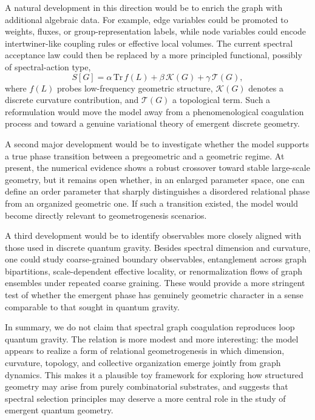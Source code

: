 \documentclass[11pt]{article}
\begin{document}
A natural development in this direction would be to enrich the graph with additional algebraic data.
For example, edge variables could be promoted to weights, fluxes, or group-representation labels, while node variables could encode intertwiner-like coupling rules or effective local volumes.
The current spectral acceptance law could then be replaced by a more principled functional, possibly of spectral-action type,
\[
S[G] = \alpha\,\mathrm{Tr}\,f(L) + \beta\,\mathcal{K}(G) + \gamma\,\mathcal{T}(G),
\]
where $f(L)$ probes low-frequency geometric structure, $\mathcal{K}(G)$ denotes a discrete curvature contribution, and $\mathcal{T}(G)$ a topological term.
Such a reformulation would move the model away from a phenomenological coagulation process and toward a genuine variational theory of emergent discrete geometry.

A second major development would be to investigate whether the model supports a true phase transition between a pregeometric and a geometric regime.
At present, the numerical evidence shows a robust crossover toward stable large-scale geometry, but it remains open whether, in an enlarged parameter space, one can define an order parameter that sharply distinguishes a disordered relational phase from an organized geometric one.
If such a transition existed, the model would become directly relevant to geometrogenesis scenarios.

A third development would be to identify observables more closely aligned with those used in discrete quantum gravity.
Besides spectral dimension and curvature, one could study coarse-grained boundary observables, entanglement across graph bipartitions, scale-dependent effective locality, or renormalization flows of graph ensembles under repeated coarse graining.
These would provide a more stringent test of whether the emergent phase has genuinely geometric character in a sense comparable to that sought in quantum gravity.

In summary, we do not claim that spectral graph coagulation reproduces loop quantum gravity.
The relation is more modest and more interesting:
the model appears to realize a form of relational geometrogenesis in which dimension, curvature, topology, and collective organization emerge jointly from graph dynamics.
This makes it a plausible toy framework for exploring how structured geometry may arise from purely combinatorial substrates, and suggests that spectral selection principles may deserve a more central role in the study of emergent quantum geometry.
\end{document}

